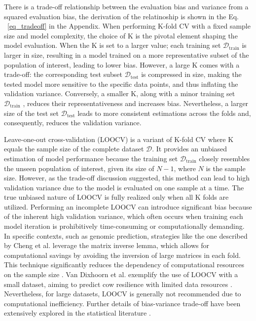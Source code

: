 There is a trade-off relationship between the evaluation bias and variance from a squared evaluation bias, the derivation of the relatinoship is shown in the Eq. ~\ref{eq_tradeoff} in the Appendix. When performing K-fold CV with a fixed sample size and model complexity, the choice of K is the pivotal element shaping the model evaluation. When the K is set to a larger value; each training set $\mathcal{D}_\text{train}$ is larger in size, resulting in a model trained on a more representative subset of the population of interest, leading to lower bias. However, a large K comes with a trade-off: the corresponding test subset $\mathcal{D}_\text{test}$ is compressed in size, making the tested model more sensitive to the specific data points, and thus inflating the validation variance. Conversely, a smaller K, along with a minor training set $\mathcal{D}_\text{train}$ , reduces their representativeness and increases bias. Nevertheless, a larger size of the test set $\mathcal{D}_\text{test}$ leads to more consistent estimations across the folds and, consequently, reduces the validation variance.

Leave-one-out cross-validation (LOOCV) is a variant of K-fold CV where K equals the sample size of the complete dataset $\mathcal{D}$. It provides an unbiased estimation of model performance because the training set $\mathcal{D}_\text{train}$ closely resembles the unseen population of interest, given its size of $N - 1$, where $N$ is the sample size. However, as the trade-off discussion suggested, this method can lead to high validation variance due to the model is evaluated on one sample at a time. The true unbiased nature of LOOCV is fully realized only when all K folds are utilized. Performing an incomplete LOOCV can introduce significant bias because of the inherent high validation variance, which often occurs when training each model iteration is prohibitively time-consuming or computationally demanding. In specific contexts, such as genomic prediction, strategies like the one described by Cheng et al. leverage the matrix inverse lemma, which allows for computational savings by avoiding the inversion of large matrices in each fold. This technique significantly reduces the dependency of computational resources on the sample size \citep{cheng_efficient_2017}. Van Dixhoorn et al. exemplify the use of LOOCV with a small dataset, aiming to predict cow resilience with limited data resources \citep{van_dixhoorn_indicators_2018}. Nevertheless, for large datasets, LOOCV is generally not recommended due to computational inefficiency. Further details of bias-variance trade-off have been extensively explored in the statistical literature \citep{hastie_elements_2009, cawley_over-fitting_2010}.

